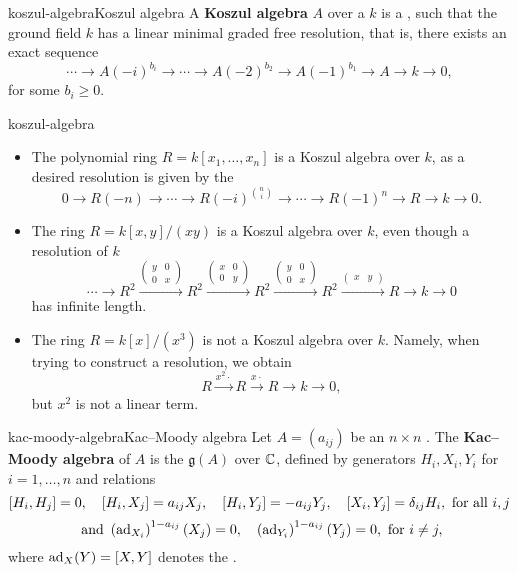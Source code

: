 \begin{topic}{koszul-algebra}{Koszul algebra}
    A \textbf{Koszul algebra} $A$ over a  $k$ is a  , such that the ground field $k$ has a linear minimal graded free resolution, that is, there exists an exact sequence
    \[ \cdots \to A(-i)^{b_i} \to \cdots \to A(-2)^{b_2} \to A(-1)^{b_1} \to A \to k \to 0 , \]
    for some $b_i \ge 0$.
\end{topic}

\begin{example}{koszul-algebra}
    \begin{itemize}
        \item The polynomial ring $R = k[x_1, \ldots, x_n]$ is a Koszul algebra over $k$, as a desired resolution is given by the 
        \[ 0 \to R(-n) \to \cdots \to R(-i)^{\binom{n}{i}} \to \cdots \to R(-1)^n \to R \to k \to 0 . \]
        \item The ring $R = k[x, y]/(xy)$ is a Koszul algebra over $k$, even though a resolution of $k$
        \[ \cdots \to R^2 \xrightarrow{\begin{pmatrix} y & 0 \\ 0 & x \end{pmatrix}} R^2 \xrightarrow{\begin{pmatrix} x & 0 \\ 0 & y \end{pmatrix}} R^2 \xrightarrow{\begin{pmatrix} y & 0 \\ 0 & x \end{pmatrix}} R^2 \xrightarrow{\begin{pmatrix} x & y \end{pmatrix}} R \to k \to 0 \]
        has infinite length.
        \item The ring $R = k[x] / (x^3)$ is not a Koszul algebra over $k$. Namely, when trying to construct a resolution, we obtain
        \[ R \xrightarrow{x^2 \cdot} R \xrightarrow{x \cdot} R \to k \to 0 , \]
        but $x^2$ is not a linear term.
    \end{itemize}
\end{example}

\begin{topic}{kac-moody-algebra}{Kac--Moody algebra}
    Let $A = (a_{ij})$ be an $n \times n$ . The \textbf{Kac--Moody algebra} of $A$ is the  $\mathfrak{g}(A)$ over $\mathbb{C}$, defined by generators $H_i, X_i, Y_i$ for $i = 1, \ldots, n$ and relations
    \[ [H_i, H_j] = 0, \quad [H_i, X_j] = a_{ij} X_j, \quad [H_i, Y_j] = -a_{ij} Y_j, \quad [X_i, Y_j] = \delta_{ij} H_i , \textup{ for all } i, j \]
    \[ \textup{ and } \left(\textup{ad}_{X_i}\right)^{1 - a_{ij}}(X_j) = 0, \quad \left(\textup{ad}_{Y_i}\right)^{1 - a_{ij}}(Y_j) = 0, \textup{ for } i \ne j , \]
    where $\textup{ad}_X(Y) = [X, Y]$ denotes the .
\end{topic}

